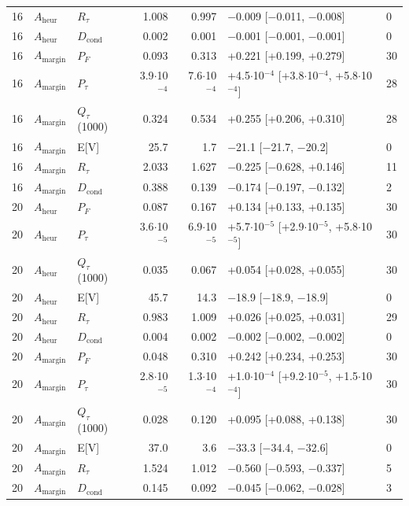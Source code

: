 \documentclass[journal]{IEEEtran}
\begin{document}
\begin{table}[!t]
\begin{tabular}{rllrrp{}p{}}
16 & $A_{\mathrm{heur}}$ & $R_{\tau}$ & 1.008 & 0.997 & $-$0.009 [$-$0.011, $-$0.008] & 0 \\
16 & $A_{\mathrm{heur}}$ & $D_{\mathrm{cond}}$ & 0.002 & 0.001 & $-$0.001 [$-$0.001, $-$0.001] & 0 \\
16 & $A_{\mathrm{margin}}$ & $P_{F}$ & 0.093 & 0.313 & +0.221 [+0.199, +0.279] & 30 \\
16 & $A_{\mathrm{margin}}$ & $P_{\tau}$ & 3.9$\cdot$10$^{-4}$ & 7.6$\cdot$10$^{-4}$ & +4.5$\cdot$10$^{-4}$ [+3.8$\cdot$10$^{-4}$, +5.8$\cdot$10$^{-4}$] & 28 \\
16 & $A_{\mathrm{margin}}$ & $Q_{\tau}$(1000) & 0.324 & 0.534 & +0.255 [+0.206, +0.310] & 28 \\
16 & $A_{\mathrm{margin}}$ & E[V] & 25.7 & 1.7 & $-$21.1 [$-$21.7, $-$20.2] & 0 \\
16 & $A_{\mathrm{margin}}$ & $R_{\tau}$ & 2.033 & 1.627 & $-$0.225 [$-$0.628, +0.146] & 11 \\
16 & $A_{\mathrm{margin}}$ & $D_{\mathrm{cond}}$ & 0.388 & 0.139 & $-$0.174 [$-$0.197, $-$0.132] & 2 \\
20 & $A_{\mathrm{heur}}$ & $P_{F}$ & 0.087 & 0.167 & +0.134 [+0.133, +0.135] & 30 \\
20 & $A_{\mathrm{heur}}$ & $P_{\tau}$ & 3.6$\cdot$10$^{-5}$ & 6.9$\cdot$10$^{-5}$ & +5.7$\cdot$10$^{-5}$ [+2.9$\cdot$10$^{-5}$, +5.8$\cdot$10$^{-5}$] & 30 \\
20 & $A_{\mathrm{heur}}$ & $Q_{\tau}$(1000) & 0.035 & 0.067 & +0.054 [+0.028, +0.055] & 30 \\
20 & $A_{\mathrm{heur}}$ & E[V] & 45.7 & 14.3 & $-$18.9 [$-$18.9, $-$18.9] & 0 \\
20 & $A_{\mathrm{heur}}$ & $R_{\tau}$ & 0.983 & 1.009 & +0.026 [+0.025, +0.031] & 29 \\
20 & $A_{\mathrm{heur}}$ & $D_{\mathrm{cond}}$ & 0.004 & 0.002 & $-$0.002 [$-$0.002, $-$0.002] & 0 \\
20 & $A_{\mathrm{margin}}$ & $P_{F}$ & 0.048 & 0.310 & +0.242 [+0.234, +0.253] & 30 \\
20 & $A_{\mathrm{margin}}$ & $P_{\tau}$ & 2.8$\cdot$10$^{-5}$ & 1.3$\cdot$10$^{-4}$ & +1.0$\cdot$10$^{-4}$ [+9.2$\cdot$10$^{-5}$, +1.5$\cdot$10$^{-4}$] & 30 \\
20 & $A_{\mathrm{margin}}$ & $Q_{\tau}$(1000) & 0.028 & 0.120 & +0.095 [+0.088, +0.138] & 30 \\
20 & $A_{\mathrm{margin}}$ & E[V] & 37.0 & 3.6 & $-$33.3 [$-$34.4, $-$32.6] & 0 \\
20 & $A_{\mathrm{margin}}$ & $R_{\tau}$ & 1.524 & 1.012 & $-$0.560 [$-$0.593, $-$0.337] & 5 \\
20 & $A_{\mathrm{margin}}$ & $D_{\mathrm{cond}}$ & 0.145 & 0.092 & $-$0.045 [$-$0.062, $-$0.028] & 3 \\
\bottomrule
\end{tabular}
\end{table}
\end{document}
